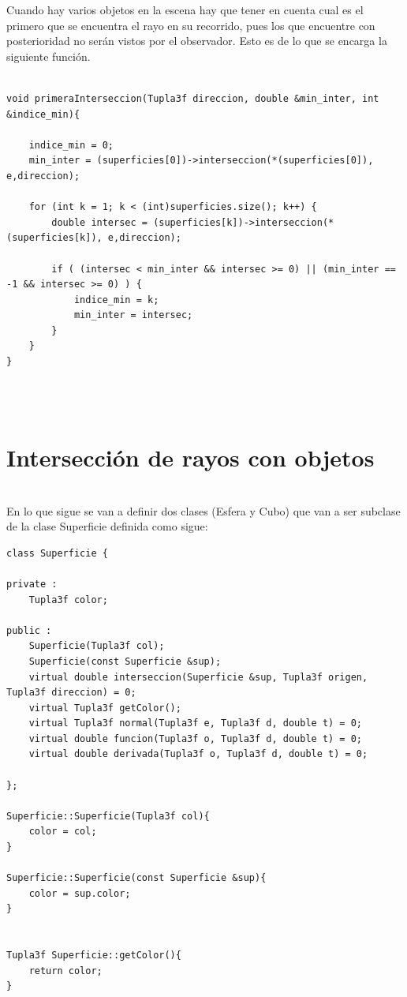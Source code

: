 Cuando hay varios objetos en la escena hay que tener en cuenta cual es el primero que se encuentra el rayo en su recorrido, pues los que encuentre con posterioridad no serán vistos por el observador. Esto es de lo que se encarga la siguiente función.
${ }$\\

\begin{lstlisting}[style=Consola]

void primeraInterseccion(Tupla3f direccion, double &min_inter, int &indice_min){

	indice_min = 0;
	min_inter = (superficies[0])->interseccion(*(superficies[0]), e,direccion);

	for (int k = 1; k < (int)superficies.size(); k++) {
		double intersec = (superficies[k])->interseccion(*(superficies[k]), e,direccion);

		if ( (intersec < min_inter && intersec >= 0) || (min_inter == -1 && intersec >= 0) ) {
			indice_min = k;
			min_inter = intersec;
		}
	}
}
\end{lstlisting}
${ }$\\

${ }$\\
\section{Intersección de rayos con objetos}
${ }$\\

En lo que sigue se van a definir dos clases (Esfera y Cubo) que van a ser subclase de la clase Superficie definida como sigue:

\begin{lstlisting}[style=Consola]
class Superficie {

private :
	Tupla3f color;

public :
	Superficie(Tupla3f col);
	Superficie(const Superficie &sup);
	virtual double interseccion(Superficie &sup, Tupla3f origen, Tupla3f direccion) = 0;
	virtual Tupla3f getColor();
	virtual Tupla3f normal(Tupla3f e, Tupla3f d, double t) = 0;
	virtual double funcion(Tupla3f o, Tupla3f d, double t) = 0;
	virtual double derivada(Tupla3f o, Tupla3f d, double t) = 0;

};

Superficie::Superficie(Tupla3f col){
	color = col;
}

Superficie::Superficie(const Superficie &sup){
	color = sup.color;
}


Tupla3f Superficie::getColor(){
	return color;
}

\end{lstlisting}
${ }$\\

